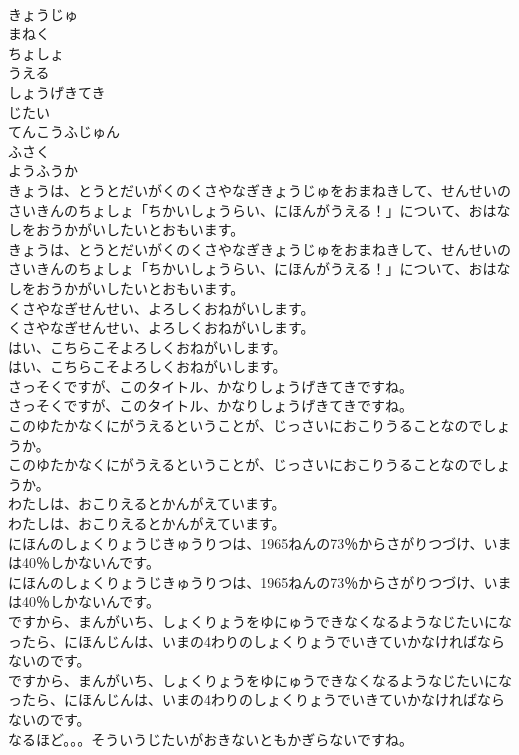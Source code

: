 \documentclass[8pt]{extreport}
\begin{document}
\begin{CJK}{UTF8}{min}
\\	きょうじゅ
\\	まねく
\\	ちょしょ
\\	うえる
\\	しょうげきてき
\\	じたい
\\	てんこうふじゅん
\\	ふさく
\\	ようふうか
\\	きょうは、とうとだいがくのくさやなぎきょうじゅをおまねきして、せんせいのさいきんのちょしょ「ちかいしょうらい、にほんがうえる！」について、おはなしをおうかがいしたいとおもいます。
\\	きょうは、とうとだいがくのくさやなぎきょうじゅをおまねきして、せんせいのさいきんのちょしょ「ちかいしょうらい、にほんがうえる！」について、おはなしをおうかがいしたいとおもいます。
\\	くさやなぎせんせい、よろしくおねがいします。
\\	くさやなぎせんせい、よろしくおねがいします。
\\	はい、こちらこそよろしくおねがいします。
\\	はい、こちらこそよろしくおねがいします。
\\	さっそくですが、このタイトル、かなりしょうげきてきですね。
\\	さっそくですが、このタイトル、かなりしょうげきてきですね。
\\	このゆたかなくにがうえるということが、じっさいにおこりうることなのでしょうか。
\\	このゆたかなくにがうえるということが、じっさいにおこりうることなのでしょうか。
\\	わたしは、おこりえるとかんがえています。
\\	わたしは、おこりえるとかんがえています。
\\	にほんのしょくりょうじきゅうりつは、1965ねんの73％からさがりつづけ、いまは40％しかないんです。
\\	にほんのしょくりょうじきゅうりつは、1965ねんの73％からさがりつづけ、いまは40％しかないんです。
\\	ですから、まんがいち、しょくりょうをゆにゅうできなくなるようなじたいになったら、にほんじんは、いまの4わりのしょくりょうでいきていかなければならないのです。
\\	ですから、まんがいち、しょくりょうをゆにゅうできなくなるようなじたいになったら、にほんじんは、いまの4わりのしょくりょうでいきていかなければならないのです。
\\	なるほど。。。そういうじたいがおきないともかぎらないですね。

\end{CJK}
\end{document}
